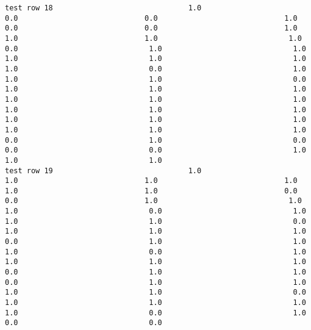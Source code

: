 \documentclass[11pt]{article}
\begin{document}
\begin{verbatim}
test row 18                               1.0                             0.0                             0.0                             1.0                             0.0                             0.0                             1.0                             1.0                             1.0                              1.0                              0.0                              1.0                              1.0                              1.0                              1.0                              1.0                              1.0                              0.0                              1.0                              1.0                              1.0                              0.0                              1.0                              1.0                              1.0                              1.0                              1.0                              1.0                              1.0                              1.0                              1.0                              1.0                              1.0                              1.0                              1.0                              1.0                              1.0                              0.0                              1.0                              0.0                              0.0                              0.0                              1.0                              1.0                              1.0
test row 19                               1.0                             1.0                             1.0                             1.0                             1.0                             1.0                             0.0                             0.0                             1.0                              1.0                              1.0                              0.0                              1.0                              1.0                              1.0                              0.0                              1.0                              1.0                              1.0                              0.0                              1.0                              1.0                              1.0                              0.0                              1.0                              1.0                              1.0                              1.0                              0.0                              1.0                              1.0                              0.0                              1.0                              1.0                              1.0                              1.0                              0.0                              1.0                              1.0                              1.0                              1.0                              0.0                              1.0                              0.0                              0.0

\end{verbatim}
\end{document}
